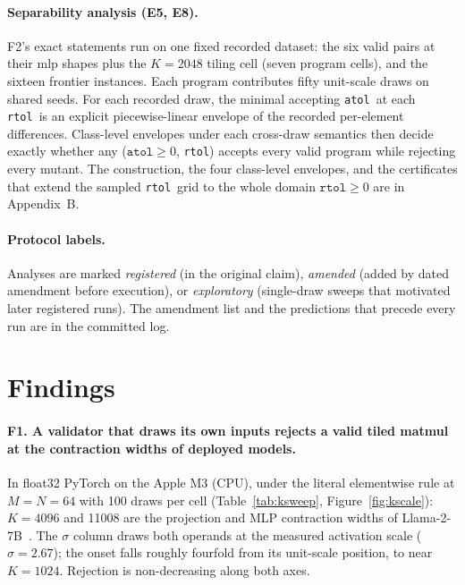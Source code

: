 \documentclass[twocolumn,10pt]{article}
\newcommand{\atol}{\texttt{atol}}
\newcommand{\rtol}{\texttt{rtol}}
\begin{document}
\paragraph{Separability analysis (E5, E8).} F2's exact statements run on
one fixed recorded dataset: the six valid pairs at their mlp shapes plus
the $K{=}2048$ tiling cell (seven program cells), and the sixteen
frontier instances. Each program contributes fifty unit-scale draws on
shared seeds. For each recorded draw, the minimal accepting \atol\ at
each \rtol\ is an explicit piecewise-linear envelope of the recorded
per-element differences. Class-level envelopes under each cross-draw
semantics then decide exactly whether any ($\atol\ge0$, \rtol) accepts
every valid program while rejecting every mutant. The construction, the
four class-level envelopes, and the certificates that extend the sampled
\rtol\ grid to the whole domain $\rtol\ge0$ are in Appendix~B.

\paragraph{Protocol labels.} Analyses are marked \emph{registered} (in
the original claim), \emph{amended} (added by dated amendment before
execution), or \emph{exploratory} (single-draw sweeps that motivated
later registered runs). The amendment list and the predictions that
precede every run are in the committed log.

\section{Findings}\label{sec:findings}

\paragraph{F1. A validator that draws its own inputs rejects a valid
tiled matmul at the contraction widths of deployed models.} In float32
PyTorch on the Apple M3 (CPU), under the literal elementwise rule at
$M{=}N{=}64$ with 100 draws per cell (Table~\ref{tab:ksweep},
Figure~\ref{fig:kscale}): $K{=}4096$ and 11008 are the projection and
MLP contraction widths of Llama-2-7B~\cite{llama2}. The $\sigma$ column
draws both operands at the measured activation scale ($\sigma=2.67$);
the onset falls roughly fourfold from its unit-scale position, to near
$K{=}1024$. Rejection is non-decreasing along both axes.
\end{document}
